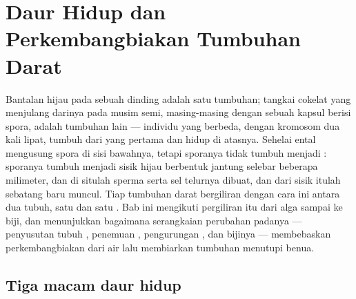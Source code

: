 \chapter{Daur Hidup dan Perkembangbiakan Tumbuhan Darat}\label{ch:b2:plant-life-cycles}

Bantalan hijau  pada sebuah dinding adalah satu tumbuhan; tangkai
cokelat yang menjulang darinya pada musim semi, masing-masing dengan
sebuah kapsul berisi spora, adalah tumbuhan lain --- individu yang
berbeda, dengan kromosom dua kali lipat, tumbuh dari yang pertama dan
hidup di atasnya. Sehelai ental  mengusung spora di sisi
bawahnya, tetapi sporanya tidak tumbuh menjadi : sporanya
tumbuh menjadi sisik hijau berbentuk jantung selebar beberapa
milimeter, dan di situlah sperma serta sel telurnya dibuat, dan dari
sisik itulah sebatang  baru muncul. Tiap tumbuhan darat
bergiliran dengan cara ini antara dua tubuh, satu  dan satu
. Bab ini mengikuti pergiliran itu dari alga sampai ke biji, dan
menunjukkan bagaimana serangkaian perubahan padanya --- penyusutan
tubuh , penemuan , pengurungan , dan
bijinya --- membebaskan perkembangbiakan dari air lalu membiarkan
tumbuhan menutupi benua.

\section{Tiga macam daur hidup}

